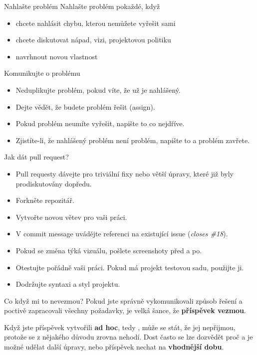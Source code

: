 \documentclass[11pt]{beamer}
\begin{document}
\begin{frame}{Nahlašte problém}
	Nahlašte problém pokaždé, když
	\begin{itemize}
		\item chcete nahlásit chybu, kterou nemůžete vyřešit sami
		\item chcete diskutovat nápad, vizi, projektovou politiku
		\item navrhnout novou vlastnost 
	\end{itemize}
\end{frame}

\begin{frame}{Komunikujte o problému}

	\begin{itemize}
		\item Neduplikujte problém, pokud víte, že už je nahlášený.
		\item Dejte vědět, že budete problém řešit (assign).
		\item Pokud problém neumíte vyřešit, napište to co nejdříve.
		\item Zjistíte-li, že nahlášený problém není problém, napište to a problém zavřete.
	\end{itemize}
\end{frame}

\begin{frame}{Jak dát pull request?}
	\begin{itemize}
		\item Pull requesty dávejte pro triviální fixy nebo větší úpravy, které již byly prodiskutovány dopředu.
		\item Forkněte repozitář.
		\item Vytvořte novou větev pro vaši práci.
		\item V commit message uvádějte referenci na existující issue (\textit{closes \#18}).
		\item Pokud se změna týká vizuálu, pošlete screenshoty před a po.
		\item Otestujte pořádně vaši práci. Pokud má projekt testovou sadu, použijte ji.
		\item Dodržujte syntaxi a styl projektu.
	\end{itemize}
\end{frame}

\begin{frame}{Co když mi to nevezmou?}
	Pokud jste správně vykomunikovali způsob řešení a poctivě zapracovali všechny požadavky, je velká šance, že \textbf{příspěvek vezmou}.
	
	Když jste příspěvek vytvořili \textbf{ad hoc}, tedy , může se stát, že jej nepřijmou, protože se z nějakého důvodu zrovna nehodí. Dost často se lze dozvědět proč a je možné udělat další úpravy, nebo příspěvek nechat na \textbf{vhodnější dobu}.
\end{frame}	
\end{document}
